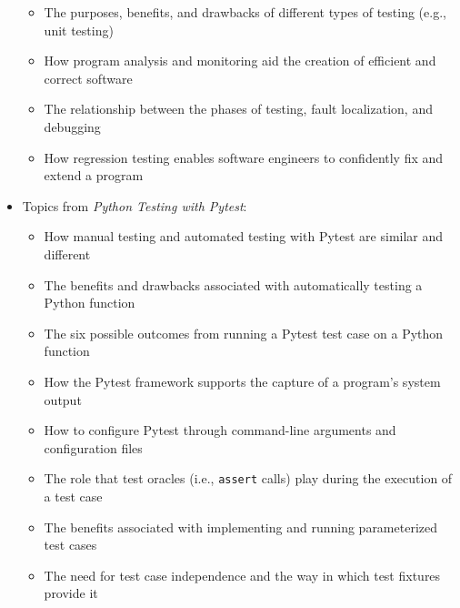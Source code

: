 \documentclass[11pt]{article}
\newcommand{\pytest}{{\em Python Testing with Pytest\/}}
\newcommand{\program}[1]{\lstinline{#1}}
\begin{document}
\begin{itemize}
\begin{itemize}
      \item The purposes, benefits, and drawbacks of different types of testing
        (e.g., unit testing)

      \item How program analysis and monitoring aid the creation of efficient
        and correct software

      \item The relationship between the phases of testing, fault localization,
        and debugging

      \item How regression testing enables software engineers to confidently fix
        and extend a program

    \end{itemize}

  \item Topics from \pytest{}:
    \vspace*{-.05in}

    \begin{itemize}

      \itemsep 0.05in

      \item How manual testing and automated testing with Pytest are similar and
        different

      \item The benefits and drawbacks associated with automatically testing a
        Python function

      \item The six possible outcomes from running a Pytest test case on a
        Python function

      \item How the Pytest framework supports the capture of a program's system
        output

      \item How to configure Pytest through command-line arguments and
        configuration files

      \item The role that test oracles (i.e., \program{assert} calls) play
        during the execution of a test case

      \item The benefits associated with implementing and running parameterized
        test cases

      \item The need for test case independence and the way in which test
        fixtures provide it


\end{itemize}
\end{itemize}
\end{document}
